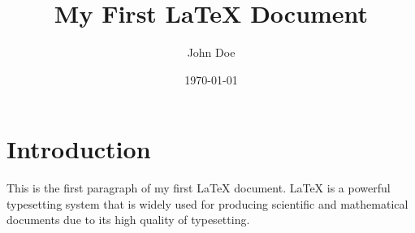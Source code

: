 \documentclass{article}
\title{My First LaTeX Document}
\author{John Doe}
\date{\today}
\begin{document}
\maketitle

\section{Introduction}
This is the first paragraph of my first LaTeX document. LaTeX is a powerful typesetting system that is widely used for producing scientific and mathematical documents due to its high quality of typesetting.
\end{document}
